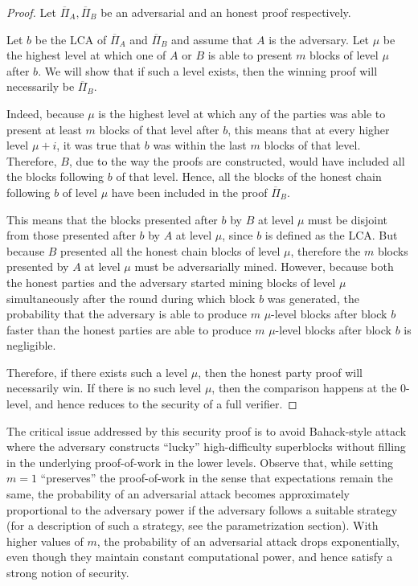 \begin{proof}
    Let $\overline{\Pi}_A, \overline{\Pi}_B$ be an adversarial and an honest
    proof respectively.

    Let $b$ be the LCA of $\overline{\Pi}_A$ and $\overline{\Pi}_B$ and assume
    that $A$ is the adversary. Let $\mu$ be the highest level at which one of $A$
    or $B$ is able to present $m$ blocks of level $\mu$ after $b$. We will show
    that if such a level exists, then the winning proof will necessarily be
    $\overline{\Pi}_B$.

    Indeed, because $\mu$ is the highest level at which any of the parties was
    able to present at least $m$ blocks of that level after $b$, this means
    that at every higher level $\mu + i$, it was true that $b$ was within the
    last $m$ blocks of that level. Therefore, $B$, due to the way the proofs
    are constructed, would have included all the blocks following $b$ of that
    level. Hence, all the blocks of the honest chain following $b$ of level
    $\mu$ have been included in the proof $\overline{\Pi}_B$.

    This means that the blocks presented after $b$ by $B$ at level $\mu$ must
    be disjoint from those presented after $b$ by $A$ at level $\mu$, since $b$
    is defined as the LCA. But because $B$ presented all the honest chain
    blocks of level $\mu$, therefore the $m$ blocks presented by $A$ at level
    $\mu$ must be adversarially mined.  However, because both the honest
    parties and the adversary started mining blocks of level $\mu$
    simultaneously after the round during which block $b$ was generated, the
    probability that the adversary is able to produce $m$ $\mu$-level blocks
    after block $b$ faster than the honest parties are able to produce $m$
    $\mu$-level blocks after block $b$ is negligible.

    Therefore, if there exists such a level $\mu$, then the honest party proof
    will necessarily win. If there is no such level $\mu$, then the comparison
    happens at the 0-level, and hence reduces to the security of a full
    verifier.
\end{proof}

The critical issue addressed by this security proof is to avoid Bahack-style
attack \cite{bahack} where the adversary constructs ``lucky'' high-difficulty
superblocks without filling in the underlying proof-of-work in the lower
levels. Observe that, while setting $m = 1$ ``preserves'' the proof-of-work in
the sense that expectations remain the same, the probability of an adversarial
attack becomes approximately proportional to the adversary power if the
adversary follows a suitable strategy (for a description of such a strategy,
see the parametrization section). With higher values of $m$, the probability of
an adversarial attack drops exponentially, even though they maintain constant
computational power, and hence satisfy a strong notion of security.

